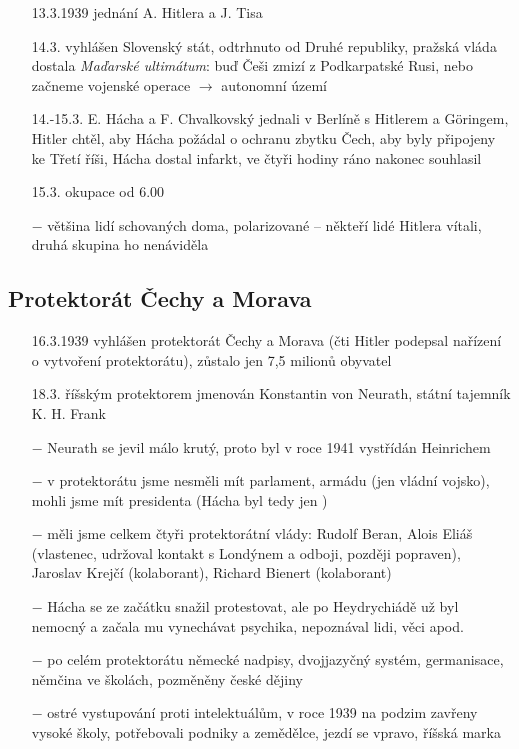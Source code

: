 \documentclass{article}
\begin{document}
\begin{itemize}
    \vspace{-0.5em}
    \setlength\itemsep{0.15em}
    \item[13.3.1939] jednání A. Hitlera a J. Tisa
    \item[14.3.] vyhlášen Slovenský stát, odtrhnuto od Druhé republiky, pražská vláda dostala \textit{Maďarské ultimátum}: buď Češi zmizí z Podkarpatské Rusi, nebo začneme vojenské operace $\rightarrow$ autonomní území
    \item[14.-15.3.] E. Hácha a F. Chvalkovský jednali v Berlíně s Hitlerem a Göringem, Hitler chtěl, aby Hácha požádal o ochranu zbytku Čech, aby byly připojeny ke Třetí říši, Hácha dostal infarkt, ve čtyři hodiny ráno nakonec souhlasil
    \item[15.3.] okupace od 6.00
    \item[$-$] většina lidí schovaných doma, polarizované -- někteří lidé Hitlera vítali, druhá skupina ho nenáviděla
\end{itemize}

\subsection*{Protektorát Čechy a Morava}
\begin{itemize}
    \vspace{-0.5em}
    \setlength\itemsep{0.15em}
    \item[16.3.1939] vyhlášen protektorát Čechy a Morava (čti Hitler podepsal nařízení o vytvoření protektorátu), zůstalo jen 7,5 milionů obyvatel
    \item[18.3.] říšským protektorem jmenován Konstantin von Neurath, státní tajemník K. H. Frank
    \item[$-$] Neurath se jevil málo krutý, proto byl v roce 1941 vystřídán Heinrichem
    \item[$-$] v protektorátu jsme nesměli mít parlament, armádu (jen vládní vojsko), mohli jsme mít presidenta (Hácha byl tedy jen )
    \item[$-$] měli jsme celkem čtyři protektorátní vlády: Rudolf Beran, Alois Eliáš (vlastenec, udržoval kontakt s Londýnem a odboji, později popraven), Jaroslav Krejčí (kolaborant), Richard Bienert (kolaborant)
    \item[$-$] Hácha se ze začátku snažil protestovat, ale po Heydrychiádě už byl nemocný a začala mu vynechávat psychika, nepoznával lidi, věci apod.
    \item[$-$] po celém protektorátu německé nadpisy, dvojjazyčný systém, germanisace, němčina ve školách, pozměněny české dějiny
    \item[$-$] ostré vystupování proti intelektuálům, v roce 1939 na podzim zavřeny vysoké školy, potřebovali podniky a zemědělce, jezdí se vpravo, říšská marka
\end{itemize}
\end{document}
